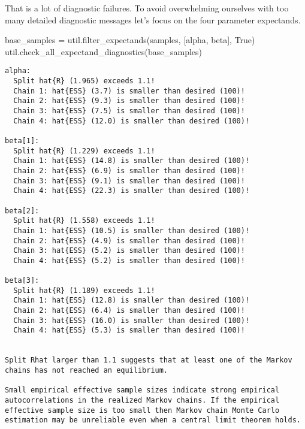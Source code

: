 \documentclass[
  letterpaper,
  DIV=11,
  numbers=noendperiod]{scrartcl}
\newenvironment{Shaded}{\begin{snugshade}}{\end{snugshade}}
\newcommand{\NormalTok}[1]{\textcolor[rgb]{0.00,0.23,0.31}{#1}}
\newcommand{\OperatorTok}[1]{\textcolor[rgb]{0.37,0.37,0.37}{#1}}
\newcommand{\StringTok}[1]{\textcolor[rgb]{0.13,0.47,0.30}{#1}}
\newcommand{\VariableTok}[1]{\textcolor[rgb]{0.07,0.07,0.07}{#1}}
\begin{document}
That is a lot of diagnostic failures. To avoid overwhelming ourselves
with too many detailed diagnostic messages let's focus on the four
parameter expectands.

\begin{Shaded}
\begin{Highlighting}[]
\NormalTok{base\_samples }\OperatorTok{=}\NormalTok{ util.filter\_expectands(samples, [}\StringTok{\textquotesingle{}alpha\textquotesingle{}}\NormalTok{, }\StringTok{\textquotesingle{}beta\textquotesingle{}}\NormalTok{], }\VariableTok{True}\NormalTok{)}
\NormalTok{util.check\_all\_expectand\_diagnostics(base\_samples)}
\end{Highlighting}
\end{Shaded}

\begin{verbatim}
alpha:
  Split hat{R} (1.965) exceeds 1.1!
  Chain 1: hat{ESS} (3.7) is smaller than desired (100)!
  Chain 2: hat{ESS} (9.3) is smaller than desired (100)!
  Chain 3: hat{ESS} (7.5) is smaller than desired (100)!
  Chain 4: hat{ESS} (12.0) is smaller than desired (100)!

beta[1]:
  Split hat{R} (1.229) exceeds 1.1!
  Chain 1: hat{ESS} (14.8) is smaller than desired (100)!
  Chain 2: hat{ESS} (6.9) is smaller than desired (100)!
  Chain 3: hat{ESS} (9.1) is smaller than desired (100)!
  Chain 4: hat{ESS} (22.3) is smaller than desired (100)!

beta[2]:
  Split hat{R} (1.558) exceeds 1.1!
  Chain 1: hat{ESS} (10.5) is smaller than desired (100)!
  Chain 2: hat{ESS} (4.9) is smaller than desired (100)!
  Chain 3: hat{ESS} (5.2) is smaller than desired (100)!
  Chain 4: hat{ESS} (5.2) is smaller than desired (100)!

beta[3]:
  Split hat{R} (1.189) exceeds 1.1!
  Chain 1: hat{ESS} (12.8) is smaller than desired (100)!
  Chain 2: hat{ESS} (6.4) is smaller than desired (100)!
  Chain 3: hat{ESS} (16.0) is smaller than desired (100)!
  Chain 4: hat{ESS} (5.3) is smaller than desired (100)!


Split Rhat larger than 1.1 suggests that at least one of the Markov
chains has not reached an equilibrium.
 
Small empirical effective sample sizes indicate strong empirical
autocorrelations in the realized Markov chains. If the empirical
effective sample size is too small then Markov chain Monte Carlo
estimation may be unreliable even when a central limit theorem holds.
 
\end{verbatim}
\end{document}
